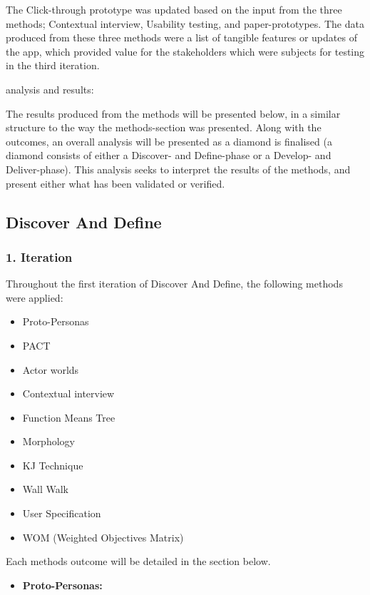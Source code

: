 The Click-through prototype was updated based on the input from the three methods; Contextual interview, Usability testing, and paper-prototypes. The data produced from these three methods were a list of tangible features or updates of the app, which provided value for the stakeholders which were subjects for testing in the third iteration.

analysis and results: 

The results produced from the methods will be presented below, in a similar structure to the way the methods-section was presented. Along with the outcomes, an overall analysis will be presented as a diamond is finalised (a diamond consists of either a Discover- and Define-phase or a Develop- and Deliver-phase). This analysis seeks to interpret the results of the methods, and present either what has been validated or verified. 

\subsection{Discover And Define}

\subsubsection{1. Iteration}

Throughout the first iteration of Discover And Define, the following methods were applied:

\begin{itemize}
    \item Proto-Personas
    \item PACT
    \item Actor worlds
    \item Contextual interview
    \item Function Means Tree
    \item Morphology
    \item KJ Technique 
    \item Wall Walk
    \item User Specification
    \item WOM (Weighted Objectives Matrix)
\end{itemize}

Each methods outcome will be detailed in the section below.

\begin{itemize}
    \item \bf{Proto-Personas:}
\end{itemize}

